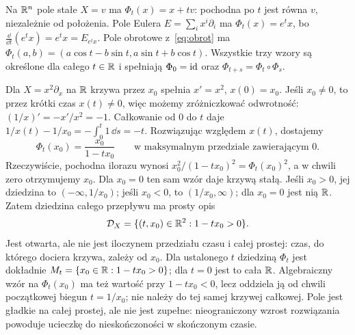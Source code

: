 \begin{przyklad}
Na $\mathbb{R}^n$ pole stałe $X=v$ ma $\Phi_t(x)=x+tv$:
pochodna po $t$ jest równa $v$, niezależnie od położenia.
Pole Eulera $E=\sum_i x^i\partial_i$ ma $\Phi_t(x)=e^t x$,
bo $\frac{\dd}{\dd t}(e^t x)=e^t x=E_{e^t x}$.
Pole obrotowe z~\eqref{eq:obrot} ma
$\Phi_t(a,b)=(a\cos t-b\sin t,a\sin t+b\cos t)$.
Wszystkie trzy wzory są określone dla całego $t\in\mathbb{R}$ i
spełniają $\Phi_0=\mathrm{id}$ oraz $\Phi_{t+s}=\Phi_t\circ\Phi_s$.
\end{przyklad}

\begin{przyklad}\label{prz:niezupelne}
Dla $X=x^2\partial_x$ na $\mathbb{R}$ krzywa przez $x_0$ spełnia
$x'=x^2$, $x(0)=x_0$. Jeśli $x_0\ne0$, to przez krótki
czas $x(t)\ne0$, więc możemy zróżniczkować odwrotność:
$(1/x)'=-x'/x^2=-1$.
Całkowanie od $0$ do $t$ daje
$1/x(t)-1/x_0=-\int_0^t1\,\dd s=-t$.
Rozwiązując względem $x(t)$, dostajemy
\[
 \Phi_t(x_0)=\frac{x_0}{1-tx_0}
 \qquad\text{w maksymalnym przedziale zawierającym }0.
\]
Rzeczywiście, pochodna ilorazu wynosi
$x_0^2/(1-tx_0)^2=\Phi_t(x_0)^2$, a w chwili zero
otrzymujemy $x_0$. Dla $x_0=0$ ten sam wzór daje krzywą stałą.
Jeśli $x_0>0$, jej dziedzina to $(-\infty,1/x_0)$; jeśli $x_0<0$,
to $(1/x_0,\infty)$; dla $x_0=0$ jest nią $\mathbb{R}$.
Zatem dziedzina całego przepływu ma prosty opis
\[
\mathcal D_X=\{(t,x_0)\in\mathbb{R}^2:1-tx_0>0\}.
\]
Jest otwarta, ale nie jest iloczynem przedziału czasu i
całej prostej: czas, do którego dociera krzywa, zależy od $x_0$.
Dla ustalonego $t$ dziedziną $\Phi_t$ jest dokładnie
$M_t=\{x_0\in\mathbb{R}:1-tx_0>0\}$; dla $t=0$ jest to cała $\mathbb{R}$.
Algebraiczny wzór na $\Phi_t(x_0)$ ma też wartość przy
$1-tx_0<0$, lecz oddziela ją od chwili początkowej biegun
$t=1/x_0$; nie należy do tej samej krzywej całkowej.
Pole jest gładkie na całej prostej,
ale nie jest zupełne: nieograniczony wzrost rozwiązania powoduje
ucieczkę do nieskończoności w skończonym czasie.
\end{przyklad}

